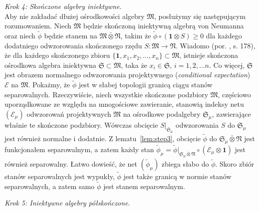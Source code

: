 {\it Krok 4: Skończone algebry iniektywne}.\\
Aby nie zakładać dłużej ośrodkowości algebry $\mathfrak{M}$,
posłużymy się następującym rozumowaniem.
Niech $\mathfrak{M}$ będzie skończoną iniektywną algebrą von Neumanna oraz
niech $\tilde{\phi}$ będzie stanem na $\mathfrak{M} \bar{\otimes} \mathfrak{N}$,
takim że $\tilde{\phi} \circ (\mathbf{1} \otimes S) \geq 0$
dla każdego dodatniego odwzorowania skończonego rzędu
$S:\mathfrak{M} \rightarrow \mathfrak{N}$.
Wiadomo (por. \cite{Takesaki3}, s. 178), że
dla każdego skończonego zbioru
$\{ \mathbf{1}, x_{1}, x_{2}, \ldots, x_{n} \} \subset \mathfrak{M}$,
istnieje skończona ośrodkowa algebra iniektywna
$\mathfrak{S} \subset \mathfrak{M}$,
taka że $x_{i} \in \mathfrak{S}$, $i =1, 2, \ldots n$.
Co więcej, $\mathfrak{S}$
jest obrazem normalnego odwzorowania projektywnego
(\emph{conditional expectation}) $\mathcal{E}$ na $\mathfrak{M}$.
Pokażmy, że $\tilde{\phi}$ jest w słabej topologii granicą ciągu stanów separowalnych.
Rzeczywiście, niech wszystkie skończone podzbiory $\mathfrak{M}$,
częściowo uporządkowane ze względu na mnogościowe zawieranie,
stanowią indeksy netu $(\mathcal{E}_{\mu})$
odwzorowań projektywnych $\mathfrak{M}$
na ośrodkowe podalgebry $\mathfrak{S}_{\mu}$,
zawierające właśnie te skończone podzbiory.
Wówczas obcięcie $S|_{\mathfrak{S}_{\mu}}$ odwzorowania $S$
do $\mathfrak{S}_{\mu}$ jest również normalne i dodatnie.
Z \mbox{lematu \ref{lem:step3}}, obcięcie $\tilde{\phi}$ do
$\mathfrak{S}_{\mu} \bar{\otimes} \mathfrak{N}$
jest funkcjonałem separowalnym, a zatem każdy stan
$\tilde{\phi}_{\mu} = \tilde{\phi}|_{\mathfrak{S}_{\mu}
\bar{\otimes} \mathfrak{N}} \circ (\mathcal{E}_{\mu} \otimes \mathbf{1})$
jest również separowalny.
Łatwo dowieść, że net $(\tilde{\phi}_{\mu})$ zbiega słabo do $\tilde{\phi}$.
Skoro zbiór stanów separowalnych jest wypukły,
$\tilde{\phi}$ jest także granicą w normie stanów separowalnych,
a zatem samo $\tilde{\phi}$ jest stanem separowalnym.

\vspace{0.3cm}
{\it Krok 5: Iniektywne algebry półskończone}.

